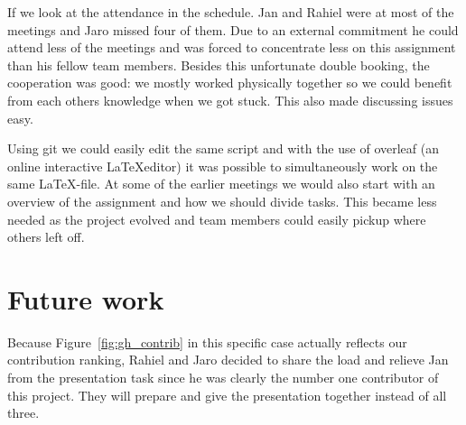 \documentclass[runningheads,a4paper]{llncs}
\begin{document}
If we look at the attendance in the schedule. Jan and Rahiel were at most of the meetings and 
Jaro missed four of them. Due to an external commitment he could attend less of the meetings and was forced to concentrate less on this assignment than his fellow team members. Besides this unfortunate double booking, the cooperation was good: we mostly worked physically together so we could benefit from each others knowledge when we got stuck. This also made discussing issues easy. 

Using git we could easily edit the same script and with the use of overleaf (an online interactive \LaTeX editor) it was possible to simultaneously work on the same \LaTeX-file. At some of the earlier meetings we would also start with an overview of the assignment and how we should divide tasks. This became less needed as the project evolved and team members could easily pickup where others left off.  

\section{Future work}
Because Figure~\ref{fig:gh_contrib} in this specific case actually reflects our contribution ranking, Rahiel and Jaro decided to share the load and relieve Jan from the presentation task since he was clearly the number one contributor of this project. They will prepare and give the presentation together instead of all three. 
\end{document}
